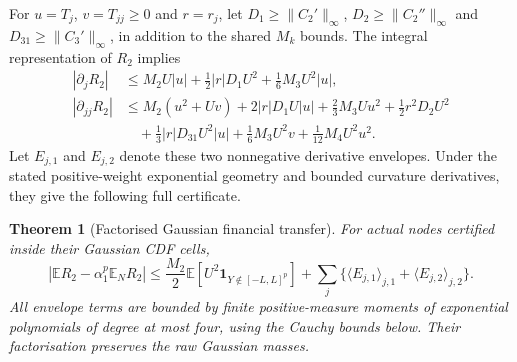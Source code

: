 \documentclass[11pt]{article}
\newtheorem{theorem}{Theorem}[section]
\newcommand{\E}{\mathbb E}
\newcommand{\ind}{\mathbf 1}
\begin{document}
For $u=T_j$, $v=T_{jj}\geq0$ and $r=r_j$, let
$D_1\geq\|C_2'\|_\infty$, $D_2\geq\|C_2''\|_\infty$ and
$D_{31}\geq\|C_3'\|_\infty$, in addition to the shared $M_k$ bounds.
The integral representation of $R_2$ implies
\begin{align}
 |\partial_jR_2|&\leq M_2U|u|+\tfrac12|r|D_1U^2
                                  +\tfrac16M_3U^2|u|,\\
 |\partial_{jj}R_2|&\leq M_2(u^2+Uv)+2|r|D_1U|u|
 +\tfrac23M_3Uu^2+\tfrac12r^2D_2U^2\\
 &\quad+\tfrac13|r|D_{31}U^2|u|
                +\tfrac16M_3U^2v+\tfrac1{12}M_4U^2u^2.
\end{align}
Let $E_{j,1}$ and $E_{j,2}$ denote these two nonnegative derivative
envelopes. Under the stated positive-weight exponential geometry and
bounded curvature derivatives, they give the following full certificate.
\begin{theorem}[Factorised Gaussian financial transfer]
\label{thm:tensor-transfer}
For actual nodes certified inside their Gaussian CDF cells,
\begin{equation}
 |\E R_2-\alpha_1^p\E_NR_2|
 \leq \frac{M_2}{2}\E[U^2\ind_{Y\notin[-L,L]^p}]
 +\sum_j\{\langle E_{j,1}\rangle_{j,1}
                    +\langle E_{j,2}\rangle_{j,2}\}.
\end{equation}
All envelope terms are bounded by finite positive-measure moments of
exponential polynomials of degree at most four, using the Cauchy bounds
below. Their factorisation preserves the raw Gaussian masses.
\end{theorem}
\end{document}

